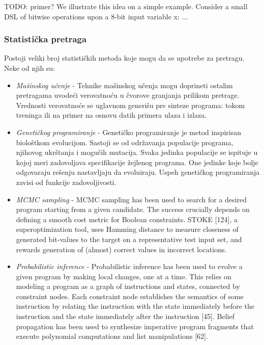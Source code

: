 TODO: primer?
We illustrate this idea on a simple example. Consider a small DSL
of bitwise operations upon a 8-bit input variable x:
...

\subsubsection{Statistička pretraga}
\label{subsubsec:Statistical}

Postoji veliki broj statističkih metoda koje mogu da se upotrebe za pretragu. Neke od njih su:
\begin{itemize}
  \item \emph{Mašinskog učenje} - Tehnike mašinskog učenja mogu doprineti ostalim pretragama uvodeći verovatnoću u čvorove granjanja prilikom pretrage. Vrednosti verovatnoće se uglavnom generišu pre sinteze programa: tokom treninga ili na primer na osnovu datih primera ulaza i izlaza. 

  \item \emph{Genetičkog programiranje} - Genetičko programiranje je metod inspirisan biološtkom evolucijom. Sastoji se od održavanja populacije programa, njihovog ukrštanja i mogučih mutacija. Svaka jedinka populacije se ispituje u kojoj meri zadovoljava specifikacije žejlenog programa. One jedinke koje bolje odgovaraju rešenju nastavljaju da evoluiraju. Uspeh genetičkog programiranja zavisi od funkcije zadovoljivosti.

  \item \emph{MCMC sampling} - MCMC sampling has been used to search for a desired program
starting from a given candidate. The success crucially depends on
defining a smooth cost metric for Boolean constraints. STOKE [124], a
superoptimization tool, uses Hamming distance to measure closeness
of generated bit-values to the target on a representative test input set,
and rewards generation of (almost) correct values in incorrect locations.


  \item \emph{Probabilistic inference} - Probabilistic inference has been used to evolve a given program by
making local changes, one at a time. This relies on modeling a program
as a graph of instructions and states, connected by constraint nodes.
Each constraint node establishes the semantics of some instruction by
relating the instruction with the state immediately before the instruction
and the state immediately after the instruction [45]. Belief propagation
has been used to synthesize imperative program fragments that execute
polynomial computations and list manipulations [62].

\end{itemize}
